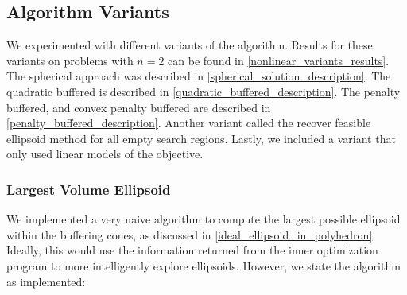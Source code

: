 \subsection{Algorithm Variants}

We experimented with different variants of the algorithm.
Results for these variants on problems with $n=2$ can be found in \cref{nonlinear_variants_results}.
The spherical approach was described in \cref{spherical_solution_description}.
The quadratic buffered is described in \cref{quadratic_buffered_description}.
The penalty buffered, and convex penalty buffered are described in \cref{penalty_buffered_description}.
Another variant called the recover feasible ellipsoid method for all empty search regions.
Lastly, we included a variant that only used linear models of the objective.

\subsubsection{Largest Volume Ellipsoid}
We implemented a very naive algorithm to compute the largest possible ellipsoid within the buffering cones, as discussed in \cref{ideal_ellipsoid_in_polyhedron}.
Ideally, this would use the information returned from the inner optimization program to more intelligently explore ellipsoids.
However, we state the algorithm as implemented:

